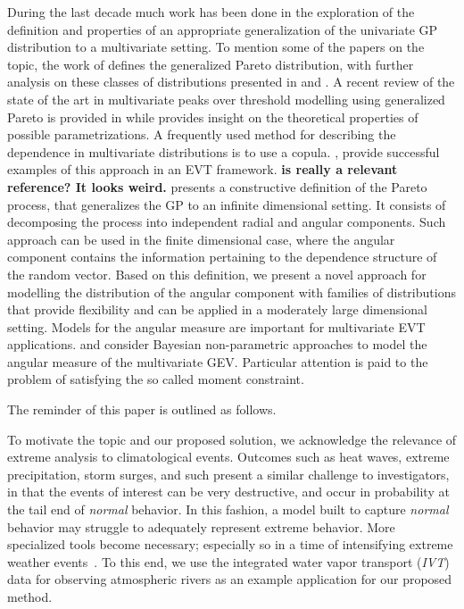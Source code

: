 During the last decade much work has been done in the exploration of the definition and properties of an
  appropriate generalization of the univariate GP distribution 
  to a multivariate setting.  To mention some of the papers on the topic, the work of
  \cite{rootzen2006} defines the generalized Pareto distribution, with further analysis on these classes
  of distributions presented in \cite{falk2008} and \cite{michel2008}.  A recent review of the state
  of the art in multivariate peaks over threshold modelling using generalized Pareto is provided in
  \cite{rootzen2018} while \cite{RoSeWa2018a} provides insight on the theoretical properties of possible parametrizations. 
  A frequently used method for describing the dependence
  in multivariate distributions is to use a copula. \cite{renard2007,deng2011,falk2019}, provide successful examples of this approach in an EVT framework. {\bf is \cite{deng2011} really a relevant reference? It looks weird.}
  \cite{ferreira2014} presents a constructive definition of the Pareto process, that generalizes the GP to an infinite dimensional setting. It consists of decomposing the process into independent radial and angular components. Such approach can be used in the finite dimensional case, where the angular component 
  contains the information pertaining to the dependence structure of the random vector.
  Based on this definition, we present a novel approach for modelling the distribution of the angular component
  with families of distributions that provide flexibility and can be applied in a moderately large dimensional setting.
  Models for the angular measure are important for multivariate EVT applications. \cite{SaNa2014} and \cite{HaCaCh2017} consider Bayesian non-parametric approaches to model the angular measure of the multivariate GEV. Particular attention is paid to the problem of satisfying the so called moment constraint.
  
  The reminder of this paper is outlined as follows. 

To motivate the topic and our proposed solution, we acknowledge the relevance of extreme analysis to
  climatological events.  Outcomes such as heat waves, extreme precipitation, storm surges, and
  such present a similar challenge to investigators, in that the events of interest can be very destructive,
  and occur in probability at the tail end of \emph{normal} behavior.  In this fashion, a model built
  to capture \emph{normal} behavior may struggle to adequately represent extreme behavior.  More
  specialized tools become necessary; especially so in a time of intensifying extreme weather
  events~\citep{jentsch2007,vousdoukas2018,li2019}.  To this end, we use the integrated water vapor
  transport (\emph{IVT}) data for observing atmospheric rivers as an example application for our proposed method.
  
